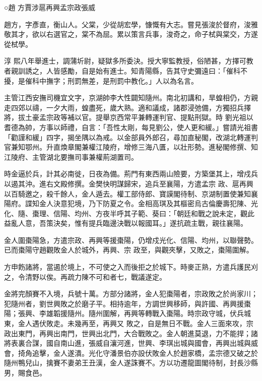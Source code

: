 
\begin{pinyinscope}

 ○趙
 方賈涉扈再興孟宗政張威



 趙方，字彥直，衡山人。父棠，少從胡宏學，慷慨有大志。嘗見張浚於督府，浚雅敬其才，欲以右選官之，棠不為屈。累以策言兵事，浚奇之，命子栻與棠交，方遂從栻學。



 淳
 熙八年舉進士，調蒲圻尉，疑獄多所委決。授大寧監教授，俗陋甚，方擇可教者親訓誘之，人皆感勵，自是始有進士。知青陽縣，告其守史彌遠曰：「催科不擾，是催科中撫字；刑罰無差，是刑罰中教化。」人以為名言。



 主管江西安撫司機宜文字，京湖帥李大性闢知隨州。南北初講和，旱蝗相仍，方親走四郊以禱，一夕大雨，蝗盡死，歲大熟。適和議成，諸郡浸弛備，方獨招兵擇將，拔土豪孟宗政等補以官。提舉京西常平兼轉運判官、提點刑獄。時
 劉光祖以耆德為帥，方事以師禮，自言：「吾性太剛，每見劉公，使人更和緩。」嘗請光祖書「勸謹和緩」四字，揭坐隅以為戒。以金部員外郎召，尋加直秘閣，改湖北轉運判官兼知鄂州。升直煥章閣兼權江陵府，增修三海八匱，以壯形勢。進秘閣修撰、知江陵府、主管湖北要撫司事兼權荊湖置司。



 時金逼於兵，計其必南徙，日夜為備。荊門有東西兩山險要，方築堡其上，增戍兵以遏其沖。進右文殿修撰。金樊快明謀歸宋，追兵至襄陽，方遣孟宗
 政、扈再興以百騎邀之，殺千餘人，金人遁去。權工部侍郎、寶謨閣待制、京湖制置使兼知襄陽府。諜知金人決意犯境，乃下防夏之令。金相高琪及其樞密烏古倫慶壽犯陳、光化、隨、棗理、信陽、均州、方夜半呼其子範、葵曰：「朝廷和戰之說未定，觀此益亂人意，吾策決矣，惟有提兵臨邊決戰以報國耳。」遂抗疏主戰，親往襄陽。



 金人圍棗陽急，方遣宗政、再興等援棗陽，仍增戍光化、信陽、均州，以聯聲勢。已而棗陽守趙觀敗金人於城外，再興、宗
 政至，與觀夾擊，又敗之，棗陽圍解。



 方申飭諸將，當遏於境上，不可使之入而後拒之於城下。時麥正熟，方遣兵護民刈之，令清野以俟。再疏力陳不可和者七，戰議遂定。



 金將完顏賽不入境，兵號十萬。方部分諸將，金人犯棗陽者，宗政敗之於尚家川；犯隨州者，劉世興敗之於磨子平。相持逾年，方調世興移師，與許國、再興援棗陽；張興、李雄韜援隨州。隨州圍解，再興等轉戰入棗陽。時宗政守城，伏兵城東，金人遇伏敗走。未幾再至，再興又
 敗之，自是無日不戰。金人三面來攻，宗政出東門，再興出南門，世興出北門，大合戰敗之。金人朝進莫退，力不能捍；諸將表裏合謀，國自南山進，張威自瀼河進，世興、李琪出城與國會，再興出城與威會，掎角追擊，金人遂潰。光化守潘景伯亦設伏敗金人於趙家橋，孟宗德又破之於隨州鴨兒山，擒賽不妻弟王丑漢，金人遂誅賽不。方以功遷龍圖閣待制，封長沙縣男，賜食邑。




\end{pinyinscope}
